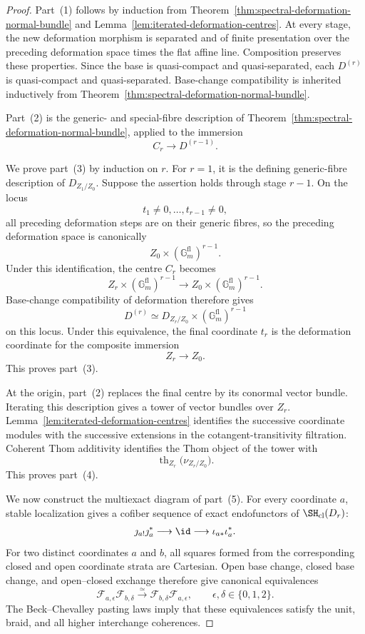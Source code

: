 \begin{proof}
Part~(1) follows by induction from
Theorem~\ref{thm:spectral-deformation-normal-bundle} and
Lemma~\ref{lem:iterated-deformation-centres}.  At every stage, the new
deformation morphism is separated and of finite presentation over the
preceding deformation space times the flat affine line.  Composition
preserves these properties.  Since the base is quasi-compact and
quasi-separated, each \(D^{(r)}\) is quasi-compact and quasi-separated.
Base-change compatibility is inherited inductively from
Theorem~\ref{thm:spectral-deformation-normal-bundle}.

Part~(2) is the generic- and special-fibre description of
Theorem~\ref{thm:spectral-deformation-normal-bundle}, applied to the
immersion
\[
    C_r\longrightarrow D^{(r-1)}.
\]

We prove part~(3) by induction on \(r\).  For \(r=1\), it is the defining
generic-fibre description of \(D_{Z_1/Z_0}\).  Suppose the assertion holds
through stage \(r-1\).  On the locus
\[
    t_1\neq0,\ldots,t_{r-1}\neq0,
\]
all preceding deformation steps are on their generic fibres, so the
preceding deformation space is canonically
\[
    Z_0\times
    (\mathbb G_m^{\mathrm{fl}})^{r-1}.
\]
Under this identification, the centre \(C_r\) becomes
\[
    Z_r\times
    (\mathbb G_m^{\mathrm{fl}})^{r-1}
    \longrightarrow
    Z_0\times
    (\mathbb G_m^{\mathrm{fl}})^{r-1}.
\]
Base-change compatibility of deformation therefore gives
\[
    D^{(r)}
    \simeq
    D_{Z_r/Z_0}
    \times
    (\mathbb G_m^{\mathrm{fl}})^{r-1}
\]
on this locus.  Under this equivalence, the final coordinate \(t_r\) is the
deformation coordinate for the composite immersion
\[
    Z_r\longrightarrow Z_0.
\]
This proves part~(3).

At the origin, part~(2) replaces the final centre by its conormal vector
bundle.  Iterating this description gives a tower of vector bundles over
\(Z_r\).  Lemma~\ref{lem:iterated-deformation-centres} identifies the
successive coordinate modules with the successive extensions in the
cotangent-transitivity filtration.  Coherent Thom additivity identifies the
Thom object of the tower with
\[
    \operatorname{th}_{Z_r}
    \bigl(
      \nu_{Z_r/Z_0}
    \bigr).
\]
This proves part~(4).

We now construct the multiexact diagram of part~(5).  For every coordinate
\(a\), stable localization gives a cofiber sequence of exact endofunctors
of \(\SH_{\mathrm{cl}}(D_r)\):
\[
    \jmath_{a!}\jmath_a^*
    \longrightarrow
    \id
    \longrightarrow
    \iota_{a*}\iota_a^*.
\]
For two distinct coordinates \(a\) and \(b\), all squares formed from the
corresponding closed and open coordinate strata are Cartesian.  Open base
change, closed base change, and open--closed exchange therefore give
canonical equivalences
\[
    \mathcal F_{a,\epsilon}
    \mathcal F_{b,\delta}
    \xrightarrow{\simeq}
    \mathcal F_{b,\delta}
    \mathcal F_{a,\epsilon},
    \qquad
    \epsilon,\delta\in\{0,1,2\}.
\]
The Beck--Chevalley pasting laws imply that these equivalences satisfy the
unit, braid, and all higher interchange coherences.


\end{proof}

